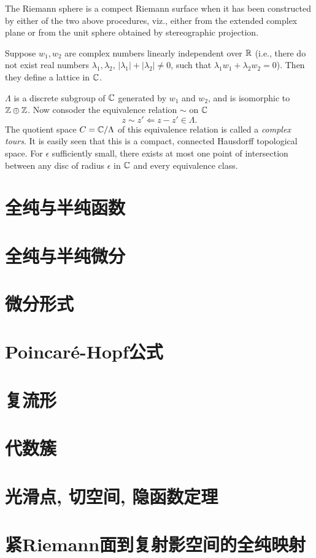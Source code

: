 \begin{example}[The set of extended complex numbers $\Sigma=\C\cup\{\infty\}$ (one point compactification of complex numbers)]
    The Riemann sphere is a compect Riemann surface when it has been constructed by either of the two above procedures, viz., either from the extended complex plane or from the unit sphere obtained by stereographic projection. 
\end{example}
\begin{example}
    Suppose $w_1,w_2$ are complex numbers linearly independent over $\mathbb{R}$ (i.e., there do not exist real numbers $\lambda_1,\lambda_2$, $|\lambda_1|+|\lambda_2|\neq0$, such that $\lambda_1w_1+\lambda_2w_2=0$). Then they define a lattice in $\mathbb{C}$. 

    $\Lambda$ is a discrete subgroup of $\mathbb{C}$ generated by $w_1$ and $w_2$, and is isomorphic to $\mathbb{Z}\oplus\mathbb{Z}$. Now consoder the equivalence relation $\sim$ on $\mathbb{C}$ 
    \[z\sim z'\Leftarrow z-z'\in\Lambda. \]
    The quotient space $C=\mathbb{C}/\Lambda$ of this equivalence relation is called a \textit{complex tours}. It is easily seen that this is a compact, connected Hausdorff topological space. For $\epsilon$ sufficiently small, there exists at most one point of intersection between any disc of radius $\epsilon$ in $\mathbb{C}$ and every equivalence class. 
\end{example}

\section{全纯与半纯函数}\label{s1-3}

\section{全纯与半纯微分}\label{s1-4}

\section{微分形式}\label{s1-5}

\section{Poincar\'e-Hopf公式}\label{s1-6}

\section{复流形}\label{s1-7}

\section{代数簇}\label{s1-8}

\section{光滑点, 切空间, 隐函数定理}\label{s1-9}

\section{紧Riemann面到复射影空间的全纯映射}\label{s1-10}
